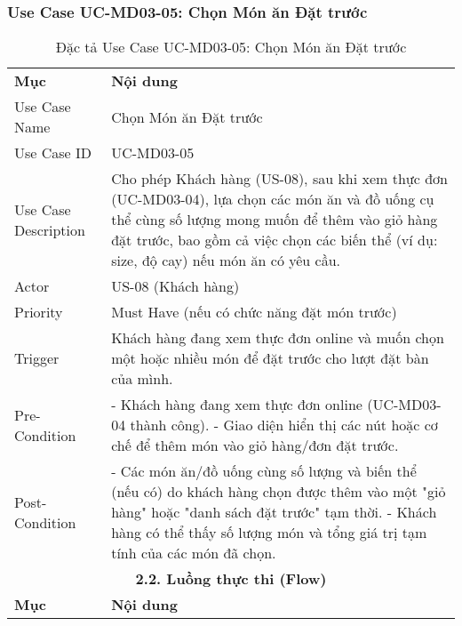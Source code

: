 \subsubsection{Use Case UC-MD03-05: Chọn Món ăn Đặt trước}

\begin{longtable}{|m{4cm}|p{11cm}|}
\caption{Đặc tả Use Case UC-MD03-05: Chọn Món ăn Đặt trước} \label{tab:uc_md03_05} \\
\hline

\endhead %
\hline
\endfoot %
\hline
\endlastfoot %
\multicolumn{2}{|c|}{\textbf{2.1. Tóm tắt (Summary)}} \\
\hline
\textbf{Mục} & \textbf{Nội dung} \\
\hline
Use Case Name & Chọn Món ăn Đặt trước \\
\hline
Use Case ID & UC-MD03-05 \\
\hline
Use Case Description & Cho phép Khách hàng (US-08), sau khi xem thực đơn (UC-MD03-04), lựa chọn các món ăn và đồ uống cụ thể cùng số lượng mong muốn để thêm vào giỏ hàng đặt trước, bao gồm cả việc chọn các biến thể (ví dụ: size, độ cay) nếu món ăn có yêu cầu. \\
\hline
Actor & US-08 (Khách hàng) \\
\hline
Priority & Must Have (nếu có chức năng đặt món trước) \\
\hline
Trigger & Khách hàng đang xem thực đơn online và muốn chọn một hoặc nhiều món để đặt trước cho lượt đặt bàn của mình. \\
\hline
Pre-Condition & - Khách hàng đang xem thực đơn online (UC-MD03-04 thành công). \newline - Giao diện hiển thị các nút hoặc cơ chế để thêm món vào giỏ hàng/đơn đặt trước. \\
\hline
Post-Condition & - Các món ăn/đồ uống cùng số lượng và biến thể (nếu có) do khách hàng chọn được thêm vào một "giỏ hàng" hoặc "danh sách đặt trước" tạm thời. \newline - Khách hàng có thể thấy số lượng món và tổng giá trị tạm tính của các món đã chọn. \\
\hline
\multicolumn{2}{|c|}{\textbf{2.2. Luồng thực thi (Flow)}} \\
\hline
\textbf{Mục} & \textbf{Nội dung} \\
\hline

\end{longtable}
